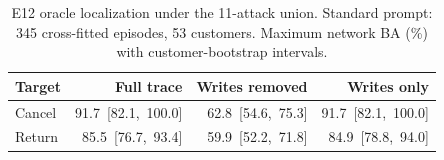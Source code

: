 \begin{table}[t]\centering\footnotesize\setlength{\tabcolsep}{2pt}
\caption{E12 oracle localization under the 11-attack union. Standard prompt: 345 cross-fitted episodes, 53 customers. Maximum network BA (\%) with customer-bootstrap intervals.}\label{tab:r7-e12}
\begin{tabular}{@{}lrrr@{}}\toprule
Target & Full trace & Writes removed & Writes only\\\midrule
Cancel & \mbox{91.7 [82.1, 100.0]} & \mbox{62.8 [54.6, 75.3]} & \mbox{91.7 [82.1, 100.0]}\\
Return & \mbox{85.5 [76.7, 93.4]} & \mbox{59.9 [52.2, 71.8]} & \mbox{84.9 [78.8, 94.0]}\\
\bottomrule\end{tabular}\end{table}
